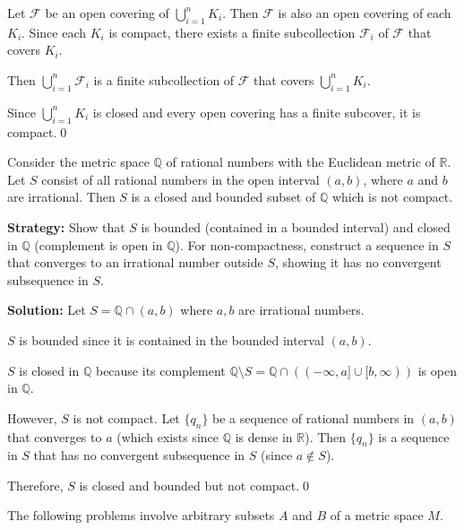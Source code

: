 Let $\mathcal{F}$ be an open covering of $\bigcup_{i=1}^n K_i$. Then $\mathcal{F}$ is also an open covering of each $K_i$. Since each $K_i$ is compact, there exists a finite subcollection $\mathcal{F}_i$ of $\mathcal{F}$ that covers $K_i$.

Then $\bigcup_{i=1}^n \mathcal{F}_i$ is a finite subcollection of $\mathcal{F}$ that covers $\bigcup_{i=1}^n K_i$.

Since $\bigcup_{i=1}^n K_i$ is closed and every open covering has a finite subcover, it is compact.\qed


\begin{problembox}
\begin{problemstatement}
Consider the metric space \( \mathbb{Q} \) of rational numbers with the Euclidean metric of \( \mathbb{R} \). Let \( S \) consist of all rational numbers in the open interval \((a, b)\), where \( a \) and \( b \) are irrational. Then \( S \) is a closed and bounded subset of \( \mathbb{Q} \) which is not compact.
\end{problemstatement}
\end{problembox}

\noindent\textbf{Strategy:} Show that $S$ is bounded (contained in a bounded interval) and closed in $\mathbb{Q}$ (complement is open in $\mathbb{Q}$). For non-compactness, construct a sequence in $S$ that converges to an irrational number outside $S$, showing it has no convergent subsequence in $S$.

\bigskip\noindent\textbf{Solution:} Let $S = \mathbb{Q} \cap (a,b)$ where $a, b$ are irrational numbers.

$S$ is bounded since it is contained in the bounded interval $(a,b)$.

$S$ is closed in $\mathbb{Q}$ because its complement $\mathbb{Q} \setminus S = \mathbb{Q} \cap ((-\infty,a] \cup [b,\infty))$ is open in $\mathbb{Q}$.

However, $S$ is not compact. Let $\{q_n\}$ be a sequence of rational numbers in $(a,b)$ that converges to $a$ (which exists since $\mathbb{Q}$ is dense in $\mathbb{R}$). Then $\{q_n\}$ is a sequence in $S$ that has no convergent subsequence in $S$ (since $a \notin S$).

Therefore, $S$ is closed and bounded but not compact.\qed


\begin{problembox}
\begin{problemstatement}
The following problems involve arbitrary subsets \( A \) and \( B \) of a metric space \( M \).
\end{problemstatement}
\end{problembox}


